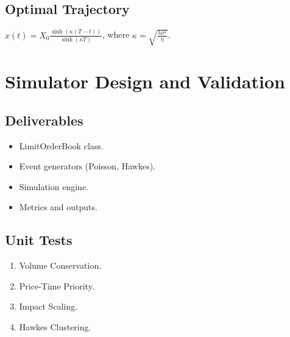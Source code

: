 \documentclass{article}
\begin{document}
\subsection{Optimal Trajectory}

$x(t) = X_0 \frac{\sinh(\kappa(T-t))}{\sinh(\kappa T)}$, where $\kappa = \sqrt{\frac{\lambda \sigma^2}{\eta}}$.


\section{Simulator Design and Validation}

\subsection{Deliverables}

\begin{itemize}
    \item LimitOrderBook class.
    \item Event generators (Poisson, Hawkes).
    \item Simulation engine.
    \item Metrics and outputs.
\end{itemize}

\subsection{Unit Tests}

\begin{enumerate}
    \item Volume Conservation.
    \item Price-Time Priority.
    \item Impact Scaling.
    \item Hawkes Clustering.
\end{enumerate}
\end{document}
